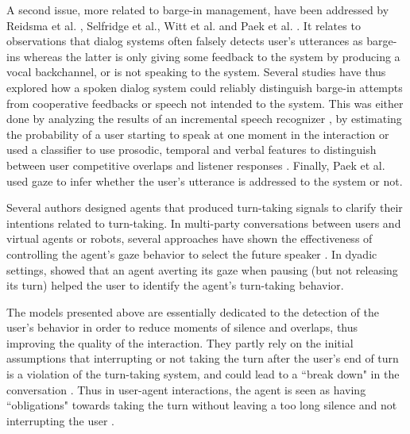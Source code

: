 A second issue, more related to barge-in management,
have been addressed by Reidsma et al. \citep{reidsma_continuous_2011}, Selfridge et al.\citep{selfridge_continuously_2013}, Witt et al.\citep{witt_modeling_2014} and Paek et al. \citep{paek_continuous_2000}. It relates to observations
that dialog systems often falsely detects user's utterances as barge-ins whereas
the latter is only giving some feedback to the system by
producing a vocal backchannel, or is not speaking to the
system. Several studies have thus explored how a spoken
dialog system could reliably distinguish barge-in
attempts from cooperative feedbacks or speech not intended
to the system. This was either done by analyzing the results of an incremental speech recognizer \citep{selfridge_continuously_2013}, by estimating the probability of a user starting to speak at one moment in the interaction \citep{witt_modeling_2014} or used a classifier to use prosodic, temporal and verbal features to distinguish between user competitive overlaps and listener responses \citep{reidsma_continuous_2011}. Finally, Paek et al. \citep{paek_continuous_2000} used gaze to infer whether the user's utterance is addressed to the system or not. 

Several authors designed agents that produced turn-taking signals to clarify their intentions related to turn-taking. In multi-party conversations between users and virtual agents or robots, several approaches have shown the effectiveness of controlling the agent's gaze behavior to select the future speaker \citep{mutlu_storytelling_2006,bohus_facilitating_2010,al_moubayed_regulating_2015}. In dyadic settings, \citep{skantze_turn-taking_2014} showed that an agent averting its gaze when pausing (but not releasing its turn) helped the user to identify the agent's turn-taking behavior.

The models presented above are essentially dedicated to the detection of the user's behavior in order to reduce moments of silence and overlaps, thus improving the quality of the interaction. 
They partly rely on the initial assumptions that interrupting or not taking the turn after the user's end of turn 
is a violation of the turn-taking system, and could lead to a ``break
down" in the conversation \citep{cutler_analysis_1986}. 
Thus in user-agent interactions, 
the agent is seen as having ``obligations" towards
taking the turn without leaving a too long silence
and not interrupting the user \citep{de_kok_multimodal_2009}.


